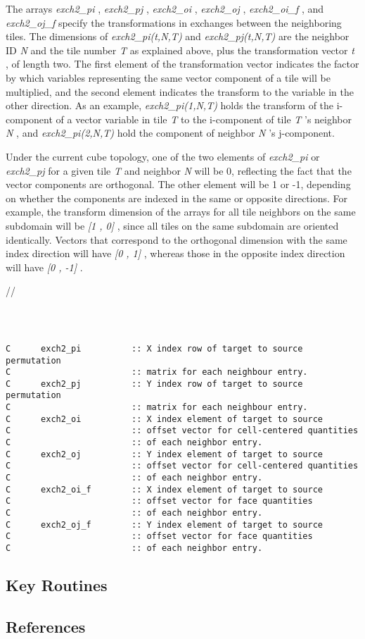 The arrays {\em exch2\_pi }, {\em exch2\_pj }, {\em exch2\_oi }, 
{\em exch2\_oj }, {\em exch2\_oi\_f }, and {\em exch2\_oj\_f }  specify 
the transformations in exchanges between the neighboring tiles.  The dimensions  
of {\em exch2\_pi(t,N,T) } and {\em exch2\_pj(t,N,T) } are the neighbor ID 
{ \em N } and the tile number {\em T } as explained above, plus the transformation
vector {\em t }, of length two.  The first element of the transformation vector indicates
the factor by which variables representing the same vector component  of a tile 
will be multiplied, and the second element indicates the transform to the 
variable in the other direction.  As an example, {\em exch2\_pi(1,N,T) } holds the 
transform of the i-component of a vector variable in tile {\em T } to the i-component of 
tile  {\em T }'s neighbor  {\em N }, and {\em exch2\_pi(2,N,T) } hold the component 
of neighbor  {\em N }'s j-component.

Under the current cube topology, one of the two elements of {\em exch2\_pi } or {\em exch2\_pj }
for a given tile   {\em T } and  neighbor  {\em N } will be 0, reflecting the fact that
the vector components are orthogonal.  The other element will be 1 or -1, depending on whether
the components are indexed in the same or opposite directions.  For example, the transform dimension
of the arrays for all tile neighbors on the same subdomain will be {\em [1 , 0] }, since all tiles on 
the same subdomain are oriented identically.  Vectors that correspond to the orthogonal dimension with the 
same index direction will have {\em [0 , 1] }, whereas those in the opposite index direction will have
{\em [0 , -1] }.




//

\begin{verbatim}



C      exch2_pi          :: X index row of target to source permutation 
C                        :: matrix for each neighbour entry.            
C      exch2_pj          :: Y index row of target to source permutation 
C                        :: matrix for each neighbour entry.            
C      exch2_oi          :: X index element of target to source 
C                        :: offset vector for cell-centered quantities  
C                        :: of each neighbor entry.                     
C      exch2_oj          :: Y index element of target to source 
C                        :: offset vector for cell-centered quantities  
C                        :: of each neighbor entry.                     
C      exch2_oi_f        :: X index element of target to source 
C                        :: offset vector for face quantities           
C                        :: of each neighbor entry.                     
C      exch2_oj_f        :: Y index element of target to source 
C                        :: offset vector for face quantities           
C                        :: of each neighbor entry.                     
\end{verbatim}




\subsection{Key Routines}



\subsection{References}
